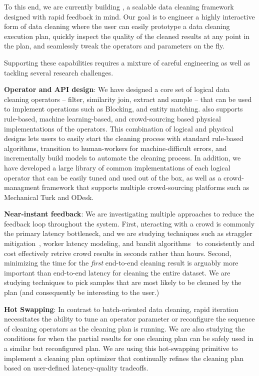 To this end, we are currently building \sys, a scalable data cleaning
framework designed with rapid feedback in mind.  Our goal is to
engineer a highly interactive form of data cleaning where the user can easily prototype a data cleaning execution plan,
quickly inspect the quality of the cleaned results at any point in the plan, and seamlessly
tweak the operators and parameters on the fly.

Supporting these capabilities requires a mixture of careful engineering 
as well as tackling several research challenges.

\squishlist
\item {\bf Operator and API design}: We have designed a core set of logical data cleaning operators --
filter, similarity join, extract and sample -- that can be used to
implement operations such as Blocking, and entity matching.  \sys also supports
rule-based, machine learning-based, and crowd-sourcing based physical implementations of the operators.  
This combination of logical and physical designs lets users to easily start the cleaning process
with standard rule-based algorithms, transition to human-workers for machine-difficult 
errors, and incrementally build models to automate the cleaning process.  
In addition, we have developed a large library of common implementations of 
each logical operator that can be easily tuned and used out of the box, as well as a crowd-managment 
framework that supports multiple crowd-sourcing platforms such as Mechanical Turk and ODesk.

\item {\bf Near-instant feedback}: We are investigating multiple approaches to reduce the 
feedback loop throughout the system.  First, nteracting with a crowd is commonly the primary latency bottleneck,
and we are studying techniques such as straggler mitigation~\cite{venkataraman2014power}, worker latency modeling, and
bandit algorithms~\cite{} to consistently and cost effectively retrive crowd results in seconds rather than hours. 
Second, minimizing the time for the {\it first} end-to-end cleaning result is arguably more important than 
end-to-end latency for cleaning the entire dataset.    We are studying techniques to pick samples that are
most likely to be cleaned by the plan (and consequently be interesting to the user.)

\item {\bf Hot Swapping}: In contrast to batch-oriented data cleaning, rapid iteration necessitates the
ability to tune an operator parameter or reconfigure the sequence of cleaning operators as the cleaning
plan is running.   We are also studying the conditions for when the partial results for one
cleaning plan can be safely used in a similar but reconfigured plan.  We are using this hot-swapping primitive
to implement a cleaning plan optimizer that continually refines the cleaning plan based on user-defined latency-quality
tradeoffs.

